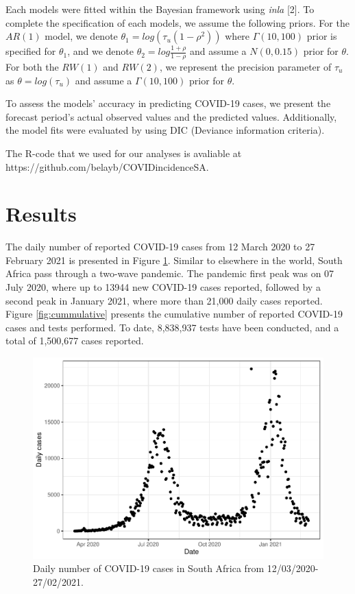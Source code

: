 \documentclass[10pt,letterpaper]{article}
\begin{document}
Each models were fitted within the Bayesian framework using
\emph{inla} {[}2{]}. To complete the specification of each models, we
assume the following priors. For the \(AR(1)\) model, we denote
\(\theta_1=log(\tau_u(1-\rho^2))\) where \(\Gamma(10,100)\) prior is
specified for \(\theta_1\), and we denote
\(\theta_2=log\frac{1+\rho}{1-\rho}\) and assume a \(N(0, 0.15)\) prior
for \(\theta\). For both the \(RW(1)\) and \(RW(2)\), we represent the precision parameter of
\(\tau_u\) as \(\theta=log(\tau_u)\) and assume a
\(\Gamma (10,100)\) prior for \(\theta\).

To assess the models' accuracy in predicting COVID-19 cases, we present
the forecast period's actual observed values and the predicted values.
Additionally, the model fits were evaluated by using DIC (Deviance
information criteria).

The R-code that we used for our analyses is avaliable at
https://github.com/belayb/COVIDincidenceSA.



\hypertarget{results}{%
\section{Results}\label{results}}

The daily number of reported COVID-19 cases from 12
March 2020 to 27 February 2021 is presented in Figure \ref{fig:daily-cases}. Similar to elsewhere in the world, South
Africa pass through a two-wave pandemic. The pandemic first peak was
on 07 July 2020, where up to 13944 new COVID-19 cases reported, followed
by a second peak in January 2021, where more than 21,000 daily cases
reported. Figure \ref{fig:cummulative} presents the cumulative number of reported
COVID-19 cases and tests performed. To date, 8,838,937 tests have been
conducted, and a total of 1,500,677 cases reported.

\begin{figure}[H]
\includegraphics[width=0.99\linewidth]{COVIDincidenceSA_files/figure-latex/daily-cases-1} \caption{Daily number of COVID-19 cases in South Africa from 12/03/2020-27/02/2021.}\label{fig:daily-cases}
\end{figure}
\end{document}
